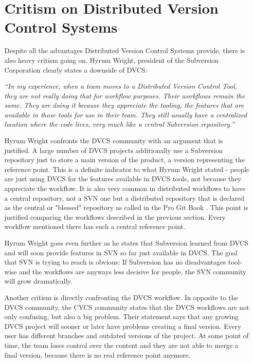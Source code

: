 \section{Critism on Distributed Version Control Systems}\label{critismondvcs}

Despite all the advantages Distributed Version Control Systems provide, there is also heavy critism going on. Hyrum Wright, president of the Subversion Corporation clearly states a downside of DVCS: 

\textit{"`In my experience, when a team moves to a Distributed Version Control Tool, they are not really doing that for workflow purposes. Their workflows remain the same. They are doing it because they appreciate the tooling, the features that are available in those tools for use in their team. They still usually have a centralized location where the code lives, very much like a central Subversion repository."'} \cite{subversionandgit}

Hyrum Wright confronts the DVCS community with an argument that is justified. A large number of DVCS projects additionally use a Subversion repository just to store a main version of the product, a version representing the reference point. This is a definite indicator to what Hyrum Wright stated - people are just using DVCS for the features available in DVCS tools, not because they appreciate the workflow. It is also very common in distributed workflows to have a central repository, not a SVN one but a distributed repository that is declared as the central or "blessed" repository as called in the Pro Git Book \cite[Chapter 5.1]{gitpro2009}. This point is justified comparing the workflows described in the previous section. Every workflow mentioned there has such a central reference point.

Hyrum Wright goes even further as he states that Subversion learned from DVCS and will soon provide features in SVN so far just available in DVCS. \cite{subversionandgit} The goal that SVN is trying to reach is obvious: If Subversion has no disadvantages tool-wise and the workflows are anyways less decisive for people, the SVN community will grow dramatically.

Another critism is directly confronting the DVCS workflow. In opposite to the DVCS community, the CVCS community states that the DVCS workflows are not only confusing, but also a big problem. Their statement says that any growing DVCS project will sooner or later have problems creating a final version. Every user has different branches and outdated versions of the project. At some point of time, the team loses control over the content and they are not able to merge a final version, because there is no real reference point anymore. 
